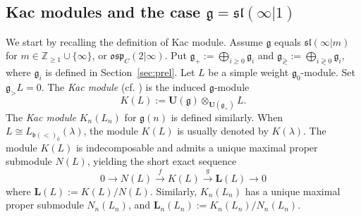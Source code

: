 \documentclass[12pt]{amsart}
\newcommand\Z{\mathbb{Z}}
\newcommand\g{\mathfrak{g}}
\newcommand\fq{\mathfrak{q}}
\newcommand\fb{\mathfrak{b}}
\newcommand\fsl{\mathfrak{sl}}
\newcommand\fosp{\mathfrak{osp}}
\newcommand\cB{\mathcal{B}}
\newcommand\bU{\mathbf{U}}
\newcommand\bL{\mathbf{L}}
\DeclareMathOperator{\Int}{Int}
\theoremstyle{plain}
\newtheorem{theo}{Theorem}[section]
\theoremstyle{definition}
\numberwithin{equation}{section}
\begin{document}

\subsection{Kac modules and the case $\g=\fsl(\infty|1)$}\label{sec:Kac-exts}
We start by recalling the definition of Kac module. Assume $\g$ equals $\fsl(\infty|m)$ for $m\in \Z_{\geq 1}\cup\{\infty\}$, or $\fosp_C(2|\infty)$. Put $\g_+ := \bigoplus_{i\geq 0} \g_i$ and $\g_{\gtrless} := \bigoplus_{i\gtrless 0} \g_i$, where $\g_i$ is defined in Section~\ref{sec:prel}. Let $L$ be a simple weight $\g_{0}$-module. Set $\g_> L=0$. The \emph{Kac module} (cf. \cite{Kac78}) is the induced $\g$-module
	\[
K(L):=\bU(\g)\otimes_{\bU(\g_+)} L.
	\]
The \emph{Kac module} $K_n(L_n)$ for $\g(n)$ is defined similarly. When $L\cong L_{\fb(<)_{\bar 0}}(\lambda)$, the module $K(L)$ is usually denoted by $K(\lambda)$. The module $K(L)$ is indecomposable and admits a unique maximal proper submodule $N(L)$, yielding the short exact sequence
	\[
0\to N(L) \stackrel{f}{\longrightarrow} K(L) \stackrel{g}{\longrightarrow} \bL(L)\to 0
	\]
where $\bL(L):=K(L)/N(L)$. Similarly, $K_n(L_n)$ has a unique maximal proper submodule $N_n(L_n)$, and $\bL_n(L_n) := K_n(L_n)/N_n(L_n)$.
\end{document}
